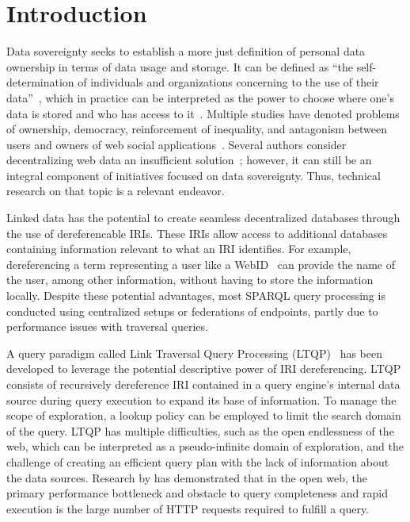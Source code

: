 \section{Introduction}

Data sovereignty seeks to establish a more just definition of personal data ownership in terms of data usage and storage.
It can be defined as ``the self-determination of individuals and organizations concerning to the use of their data''~\cite{verstraete2022solid},
which in practice can be interpreted as the power to choose where one's data is stored and who has access to it~\cite{verstraete2022solid}.
Multiple studies have denoted problems of ownership, democracy, reinforcement of inequality, and antagonism between users and owners of web social applications~\cite{Terranova2000FreeLP, Curran2016ch1, Sevignani2013, 9663788}.
Several authors consider decentralizing web data an insufficient solution~\cite{9663788, Curran2016ch1}; however, it can still be an integral component of initiatives focused on data sovereignty.
Thus, technical research on that topic is a relevant endeavor.

Linked data has the potential to create seamless decentralized databases through the use of dereferencable IRIs.
These IRIs allow access to additional databases containing information relevant to what an IRI identifies.
For example, dereferencing a term representing a user like a WebID~ can provide the name of the user, among other information, without having 
to store the information locally.
Despite these potential advantages, most SPARQL query processing is conducted using centralized setups or federations of endpoints, partly due to performance issues with traversal queries.

A query paradigm called Link Traversal Query Processing (LTQP)~\cite{Hartig2012} has been developed to leverage the potential descriptive power of IRI dereferencing.
LTQP consists of recursively dereference IRI contained in a query engine's internal data source during query execution to expand its base of information.
To manage the scope of exploration, a lookup policy can be employed to limit the search domain of the query.
LTQP has multiple difficulties, such as the open endlessness of the web, which can be interpreted as a pseudo-infinite domain of exploration,
and the challenge of creating an efficient query plan with the lack of information about the data sources. 
Research by \citeauthor{hartig2016walking} has demonstrated that in the open web, the primary performance bottleneck and obstacle to query completeness and rapid execution is the large number of HTTP requests required to fulfill a query.

